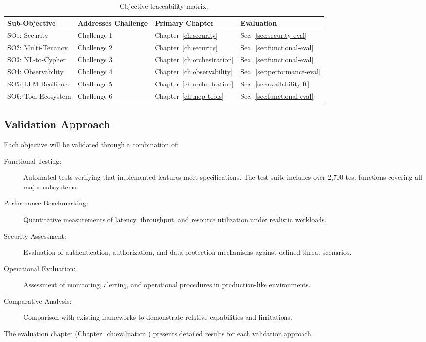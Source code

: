 \begin{table}[ht]
\centering
\caption{Objective traceability matrix.}
\label{tab:objective-traceability}
\small
\begin{tabular}{llll}
\hline
\textbf{Sub-Objective} & \textbf{Addresses Challenge} & \textbf{Primary Chapter} & \textbf{Evaluation} \\
\hline
SO1: Security & Challenge 1 & Chapter~\ref{ch:security} & Sec.~\ref{sec:security-eval} \\
SO2: Multi-Tenancy & Challenge 2 & Chapter~\ref{ch:security} & Sec.~\ref{sec:functional-eval} \\
SO3: NL-to-Cypher & Challenge 3 & Chapter~\ref{ch:orchestration} & Sec.~\ref{sec:functional-eval} \\
SO4: Observability & Challenge 4 & Chapter~\ref{ch:observability} & Sec.~\ref{sec:performance-eval} \\
SO5: LLM Resilience & Challenge 5 & Chapter~\ref{ch:orchestration} & Sec.~\ref{sec:availability-ft} \\
SO6: Tool Ecosystem & Challenge 6 & Chapter~\ref{ch:mcp-tools} & Sec.~\ref{sec:functional-eval} \\
\hline
\end{tabular}
\end{table}

\subsection{Validation Approach}

Each objective will be validated through a combination of:

\begin{description}
    \item[Functional Testing:] Automated tests verifying that implemented features meet specifications. The test suite includes over 2,700 test functions covering all major subsystems.
    
    \item[Performance Benchmarking:] Quantitative measurements of latency, throughput, and resource utilization under realistic workloads.
    
    \item[Security Assessment:] Evaluation of authentication, authorization, and data protection mechanisms against defined threat scenarios.
    
    \item[Operational Evaluation:] Assessment of monitoring, alerting, and operational procedures in production-like environments.
    
    \item[Comparative Analysis:] Comparison with existing frameworks to demonstrate relative capabilities and limitations.
\end{description}

The evaluation chapter (Chapter~\ref{ch:evaluation}) presents detailed results for each validation approach.

